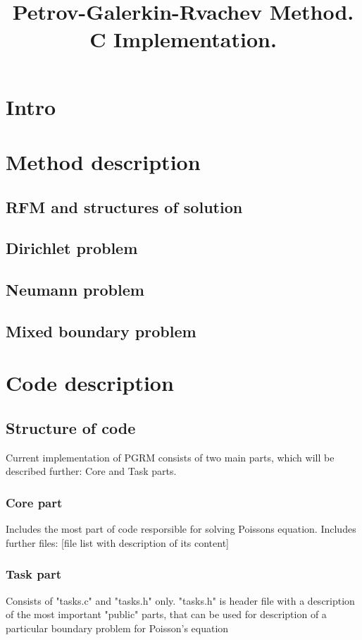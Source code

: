 \documentclass[a4paper,12pt]{article}
\title{Petrov-Galerkin-Rvachev Method.\\C Implementation.}
\author{}
\date{}
\begin{document}
\maketitle
\section{Intro}

\section{Method description}
\subsection{RFM and structures of solution}
\subsection{Dirichlet problem}
\subsection{Neumann problem}
\subsection{Mixed boundary problem}


\section{Code description}
\subsection{Structure of code}
Current implementation of PGRM consists of two main parts, which will be described further: Core and Task parts.
\subsubsection{Core part}
Includes the most part of code resporsible for solving Poissons equation. Includes further files: [file list with description of its content]
\subsubsection{Task part}
Consists of "tasks.c" and "tasks.h" only.
"tasks.h" is header file with a description of the most important "public" parts, that can be used for description of a particular boundary problem for Poisson's equation
\end{document}
